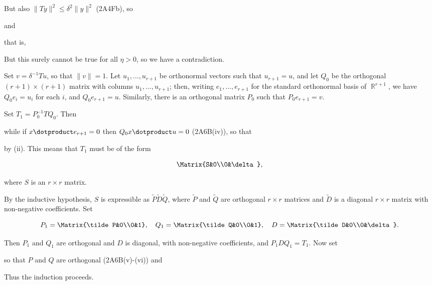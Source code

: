 {\noindent But also 
$\|Ty\|^2\le\delta^2\|y\|^2$ (2A4Fb), so 
 
 
\noindent and 
 
 
\noindent that is, 
 
 
\noindent But this surely cannot be true for all $\eta>0$, so we have a 
contradiction.\ \Bang\Qed 
 
\medskip 
 
 Set $v=\delta^{-1}Tu$, so that $\|v\|=1$.   Let 
$u_1,\ldots,u_{r+1}$ be orthonormal vectors such that $u_{r+1}=u$, and 
let $Q_0$ be the orthogonal $(r+1)\times(r+1)$ matrix with columns 
$u_1,\ldots,u_{r+1}$;  then, writing $e_1,\ldots,e_{r+1}$ for the 
standard orthonormal basis of $\BbbR^{r+1}$, we have $Q_0e_i=u_i$ for 
each $i$, and $Q_0e_{r+1}=u$.   Similarly, there is an orthogonal matrix 
$P_0$ such that $P_0e_{r+1}=v$. 
 
Set $T_1=P_0^{-1}TQ_0$.   Then 
 
 
\noindent while if $x\dotproduct e_{r+1}=0$ then  
$Q_0x\dotproduct u=0$ (2A6B(iv)), so that 
 
 
\noindent by (ii).   This means that $T_1$ must be of the form 
 
$$\Matrix{S&0\\0&\delta},$$ 
 
\noindent where $S$ is an $r\times r$ matrix. 
 
\medskip 
 
 By the inductive hypothesis, $S$ is expressible as 
$\tilde P\tilde D\tilde Q$, where $\tilde P$ and $\tilde Q$ are 
orthogonal $r\times r$ matrices and $\tilde D$ is a diagonal $r\times r$ 
matrix with non-negative coefficients.   Set 
 
$$P_1=\Matrix{\tilde P&0\\0&1},\quad Q_1=\Matrix{\tilde Q&0\\0&1},\quad 
D=\Matrix{\tilde D&0\\0&\delta}.$$ 
 
\noindent Then $P_1$ and $Q_1$ are orthogonal and $D$ is diagonal, with 
non-negative coefficients, and $P_1DQ_1=T_1$.   Now set 
 
\noindent so that $P$ and $Q$ are orthogonal (2A6B(v)-(vi)) and 
 
 
\noindent Thus the induction proceeds. 
}%
 
\frnewpage 
 
